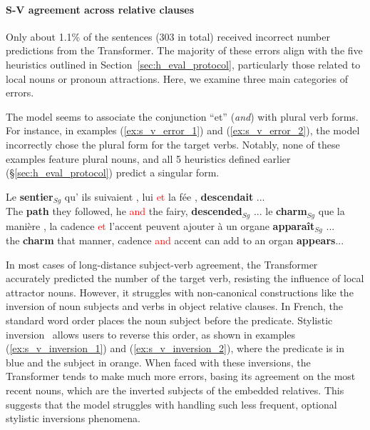 \paragraph{S-V agreement across relative clauses} Only about 1.1\% of the sentences (303 in total) received incorrect number predictions from the Transformer. The majority of these errors align with the five heuristics outlined in Section~\ref{sec:h_eval_protocol}, particularly those related to local nouns or pronoun attractions. Here, we examine three main categories of errors. 


The model seems to associate the conjunction ``et''  (\textit{and}) with plural verb forms. For instance, in examples (\ref{ex:s_v_error_1}) and (\ref{ex:s_v_error_2}), the model incorrectly chose the plural form for the target verbs. Notably, none of these examples feature plural nouns, and all 5 heuristics defined earlier (\S\ref{sec:h_eval_protocol}) predict a singular form.

\begin{exe}
    \ex \label{ex:s_v_error_1} Le \textbf{sentier}$_{Sg}$ qu' ils suivaient , lui \textcolor{red}{et} la fée , \textbf{descendait} ... \\%
    {\fontsize{11}{11}\selectfont The \textbf{path} they followed, he \textcolor{red}{and} the fairy, \textbf{descended}$_{Sg}$ ...}
        \ex \label{ex:s_v_error_2} le \textbf{charm}$_{Sg}$ que la manière , la cadence \textcolor{red}{et}  l'accent peuvent ajouter à un organe \textbf{apparaît$_{Sg}$} ... \\ %
    {\fontsize{11}{11}\selectfont the \textbf{charm} that manner, cadence \textcolor{red}{and} accent can add to an organ \textbf{appears}...}
\end{exe}

In most cases of long-distance subject-verb agreement, the Transformer accurately predicted the number of the target verb, resisting the influence of local attractor nouns. However, it struggles with non-canonical constructions like the inversion of noun subjects and verbs in object relative clauses. In French, the standard word order places the noun subject before the predicate. Stylistic inversion~\citep{kayne1972subject} allows users to reverse this order, as shown in examples (\ref{ex:s_v_inversion_1}) and (\ref{ex:s_v_inversion_2}), where the predicate is in blue and the subject in orange. When faced with these inversions, the Transformer tends to make much more errors, basing its agreement on the most recent nouns, which are the inverted subjects of the embedded relatives. This suggests that the model struggles with handling such less frequent, optional stylistic inversions phenomena.

